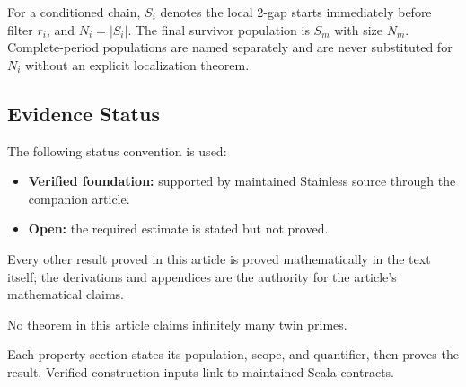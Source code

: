 For a conditioned chain, $S_i$ denotes the local 2-gap starts immediately
before filter $r_i$, and $N_i=|S_i|$. The final survivor population is
$S_m$ with size $N_m$. Complete-period populations are named separately
and are never substituted for $N_i$ without an explicit localization
theorem.

\subsection{Evidence Status}
\label{sec:evidence-status}

The following status convention is used:

\begin{itemize}
  \item \textbf{Verified foundation:} supported by maintained Stainless
    source through the companion article.
  \item \textbf{Open:} the required estimate is stated but not proved.
\end{itemize}

Every other result proved in this article is proved mathematically in the
text itself; the derivations and appendices are the authority for the
article's mathematical claims.

No theorem in this article claims infinitely many twin primes.

Each property section states its population, scope, and quantifier, then
proves the result. Verified construction inputs link to maintained Scala
contracts.
